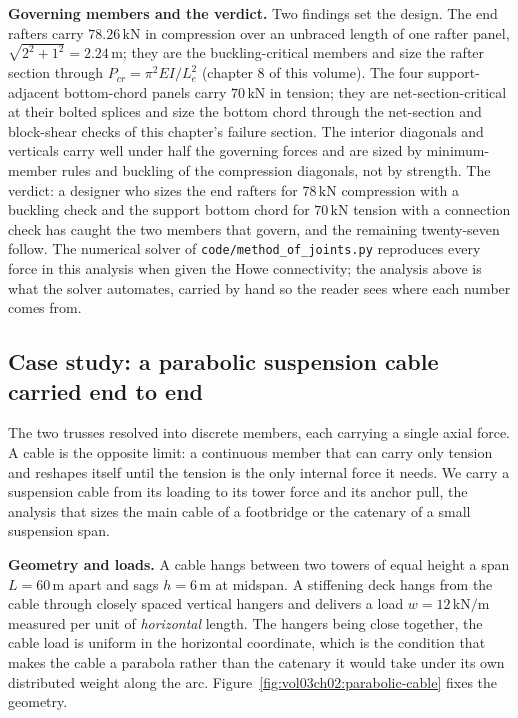 \textbf{Governing members and the verdict.} Two findings set the design.
The end rafters carry $78.26\,\text{kN}$ in compression over an unbraced
length of one rafter panel, $\sqrt{2^2 + 1^2} = 2.24\,\si{\meter}$; they
are the buckling-critical members and size the rafter section through
$P_{cr} = \pi^2 EI / L_e^2$ (chapter 8 of this volume). The four
support-adjacent bottom-chord panels carry $70\,\text{kN}$ in tension;
they are net-section-critical at their bolted splices and size the bottom
chord through the net-section and block-shear checks of this chapter's
failure section. The interior diagonals and verticals carry well under
half the governing forces and are sized by minimum-member rules and
buckling of the compression diagonals, not by strength. The verdict: a
designer who sizes the end rafters for $78\,\text{kN}$ compression with a
buckling check and the support bottom chord for $70\,\text{kN}$ tension
with a connection check has caught the two members that govern, and the
remaining twenty-seven follow. The numerical solver of
\texttt{code/method\_of\_joints.py} reproduces every force in this
analysis when given the Howe connectivity; the analysis above is what the
solver automates, carried by hand so the reader sees where each number
comes from.

\subsection{Case study: a parabolic suspension cable carried end to end}

The two trusses resolved into discrete members, each carrying a single
axial force. A cable is the opposite limit: a continuous member that can
carry only tension and reshapes itself until the tension is the only
internal force it needs. We carry a suspension cable from its loading to
its tower force and its anchor pull, the analysis that sizes the main cable
of a footbridge or the catenary of a small suspension span.

\textbf{Geometry and loads.} A cable hangs between two towers of equal
height a span $L = 60\,\si{\meter}$ apart and sags $h = 6\,\si{\meter}$ at
midspan. A stiffening deck hangs from the cable through closely spaced
vertical hangers and delivers a load $w = 12\,\text{kN}/\text{m}$ measured
per unit of \emph{horizontal} length. The hangers being close together, the
cable load is uniform in the horizontal coordinate, which is the condition
that makes the cable a parabola rather than the catenary it would take under
its own distributed weight along the arc.
Figure~\ref{fig:vol03ch02:parabolic-cable} fixes the geometry.

